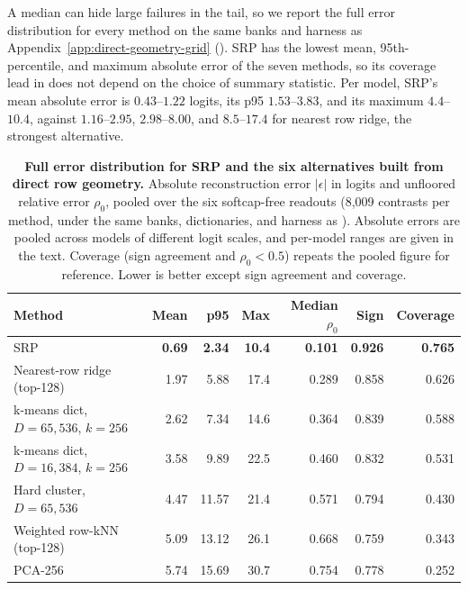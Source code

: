 A median can hide large failures in the tail, so we report the full error
distribution for every method on the same banks and harness as
Appendix~\ref{app:direct-geometry-grid}
(). SRP has the lowest mean, 95th-percentile,
and maximum absolute error of the seven methods, so its coverage lead in
 does not depend on the choice of
summary statistic. Per model, SRP's mean absolute error is
\(0.43\)--\(1.22\) logits, its p95 \(1.53\)--\(3.83\), and its maximum
\(4.4\)--\(10.4\), against \(1.16\)--\(2.95\), \(2.98\)--\(8.00\), and
\(8.5\)--\(17.4\) for nearest row ridge, the strongest alternative.

\begin{table}[!tbp]
\caption{\textbf{Full error distribution for SRP and the six
alternatives built from direct row geometry.} Absolute reconstruction error
\(|\epsilon|\) in logits and unfloored relative error \(\rho_0\),
pooled over the six softcap-free readouts (8{,}009
contrasts per method, under the same
banks, dictionaries, and harness as
). Absolute errors are pooled across
models of different logit scales, and per-model ranges are given in the
text. Coverage (sign agreement and \(\rho_0<0.5\)) repeats the
pooled figure for reference. Lower is better except sign agreement and
coverage.}
\label{tab:app-error-tails}
\centering
\footnotesize
\setlength{\tabcolsep}{5pt}
\renewcommand{\arraystretch}{1.08}
\begin{tabular}{@{}lrrrrrr@{}}
\toprule
Method & Mean & p95 & Max & Median \(\rho_0\) & Sign & Coverage \\
\midrule
SRP & \textbf{0.69} & \textbf{2.34} & \textbf{10.4} & \textbf{0.101} & \textbf{0.926} & \textbf{0.765} \\
Nearest-row ridge (top-128) & 1.97 & 5.88 & 17.4 & 0.289 & 0.858 & 0.626 \\
k-means dict, \(D{=}65{,}536\), \(k{=}256\) & 2.62 & 7.34 & 14.6 & 0.364 & 0.839 & 0.588 \\
k-means dict, \(D{=}16{,}384\), \(k{=}256\) & 3.58 & 9.89 & 22.5 & 0.460 & 0.832 & 0.531 \\
Hard cluster, \(D{=}65{,}536\) & 4.47 & 11.57 & 21.4 & 0.571 & 0.794 & 0.430 \\
Weighted row-kNN (top-128) & 5.09 & 13.12 & 26.1 & 0.668 & 0.759 & 0.343 \\
PCA-256 & 5.74 & 15.69 & 30.7 & 0.754 & 0.778 & 0.252 \\
\bottomrule
\end{tabular}
\end{table}

